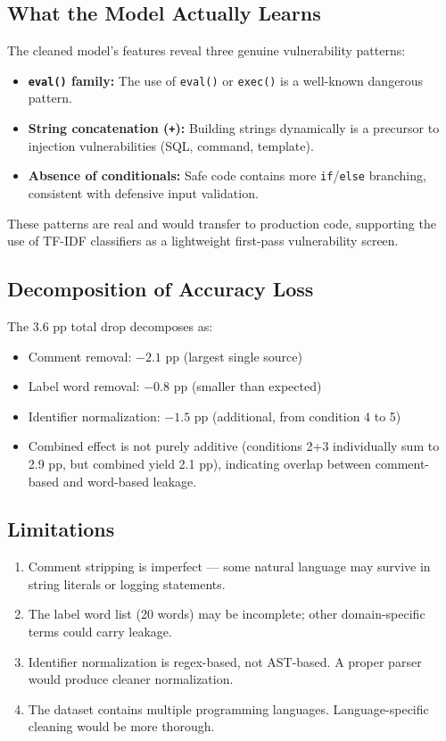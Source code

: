 \documentclass[11pt,a4paper]{article}
\begin{document}
\subsection{What the Model Actually Learns}

The cleaned model's features reveal three genuine vulnerability patterns:
\begin{itemize}
    \item \textbf{\texttt{eval()} family:} The use of \texttt{eval()} or \texttt{exec()} is a well-known dangerous pattern.
    \item \textbf{String concatenation (\texttt{+}):} Building strings dynamically is a precursor to injection vulnerabilities (SQL, command, template).
    \item \textbf{Absence of conditionals:} Safe code contains more \texttt{if}/\texttt{else} branching, consistent with defensive input validation.
\end{itemize}

These patterns are real and would transfer to production code, supporting the use of TF-IDF classifiers as a lightweight first-pass vulnerability screen.

\subsection{Decomposition of Accuracy Loss}

The 3.6 pp total drop decomposes as:
\begin{itemize}
    \item Comment removal: $-2.1$ pp (largest single source)
    \item Label word removal: $-0.8$ pp (smaller than expected)
    \item Identifier normalization: $-1.5$ pp (additional, from condition 4 to 5)
    \item Combined effect is not purely additive (conditions 2+3 individually sum to 2.9 pp, but combined yield 2.1 pp), indicating overlap between comment-based and word-based leakage.
\end{itemize}

\subsection{Limitations}

\begin{enumerate}
    \item Comment stripping is imperfect — some natural language may survive in string literals or logging statements.
    \item The label word list (20 words) may be incomplete; other domain-specific terms could carry leakage.
    \item Identifier normalization is regex-based, not AST-based. A proper parser would produce cleaner normalization.
    \item The dataset contains multiple programming languages. Language-specific cleaning would be more thorough.
\end{enumerate}
\end{document}
